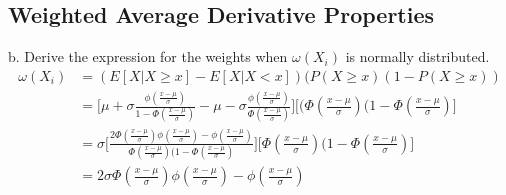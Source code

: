 \documentclass[11pt]{article}
\begin{document}
\subsection*{Weighted Average Derivative Properties}
b. Derive the expression for the weights when $\omega (X_i)$ is normally distributed. \\
\begin{align*}
\omega(X_i) &= ( E[X | X \geq x] - E[X | X < x] ) (P(X \geq x) ( 1 - P(X \geq x)) \\
&=\bigg[ \mu + \sigma \frac{\phi (\frac{x - \mu}{\sigma})}{1 - \Phi( \frac{x - \mu}{\sigma})} - \mu - \sigma \frac{\phi (\frac{x - \mu}{\sigma})}{\Phi( \frac{x - \mu}{\sigma})} \bigg] \bigg[(\Phi( \frac{x - \mu}{\sigma})(1- \Phi( \frac{x - \mu}{\sigma}) \bigg] \\
&=\sigma \bigg[\frac{2 \Phi( \frac{x - \mu}{\sigma})\phi( \frac{x - \mu}{\sigma}) - \phi( \frac{x - \mu}{\sigma}) }{\Phi( \frac{x - \mu}{\sigma})(1- \Phi( \frac{x - \mu}{\sigma})} \bigg] \bigg[\Phi( \frac{x - \mu}{\sigma})(1- \Phi( \frac{x - \mu}{\sigma})\bigg] \\
&=2\sigma \Phi( \frac{x - \mu}{\sigma})\phi( \frac{x - \mu}{\sigma}) - \phi( \frac{x - \mu}{\sigma})
\end{align*}
\end{document}
